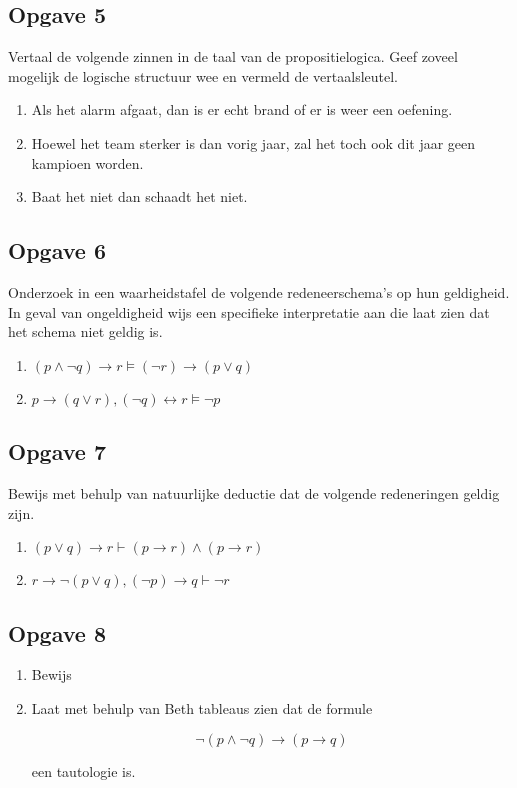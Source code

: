 \documentclass[11pt]{article}
\begin{document}
\subsection*{Opgave 5}
Vertaal de volgende zinnen in de taal van de propositielogica. Geef zoveel mogelijk de logische structuur wee en vermeld de vertaalsleutel.

\begin{enumerate}[label=\alph*]

	\item Als het alarm afgaat, dan is er echt brand of er is weer een oefening.

	\item Hoewel het team sterker is dan vorig jaar, zal het toch ook dit jaar geen kampioen worden.

	\item Baat het niet dan schaadt het niet.

\end{enumerate}


\subsection*{Opgave 6}
Onderzoek in een waarheidstafel de volgende redeneerschema's op hun geldigheid. In geval van ongeldigheid wijs een specifieke interpretatie aan die laat zien dat het schema niet geldig is.

\begin{enumerate}[label=\alph*]

	\item $(p\wedge\neg q)\rightarrow r \models (\neg r) \rightarrow (p\vee q)$

	\item $p\rightarrow(q\vee r), (\neg q) \leftrightarrow r \models \neg p$

\end{enumerate}


\subsection*{Opgave 7}
Bewijs met behulp van natuurlijke deductie dat de volgende redeneringen geldig zijn.
\begin{enumerate}[label=\alph*]

	\item $(p\vee q) \rightarrow r \vdash (p \rightarrow r) \wedge (p \rightarrow r)$

	\item $r \rightarrow \neg(p \vee q), (\neg p) \rightarrow q \vdash \neg r$

\end{enumerate}

\subsection*{Opgave 8}
\begin{enumerate}[label=\alph*]

	\item Bewijs

	\item Laat met behulp van Beth tableaus zien dat de formule

		\[\neg(p\wedge\neg q) \rightarrow (p \rightarrow q)\]

		een tautologie is.

\end{enumerate}
\end{document}
